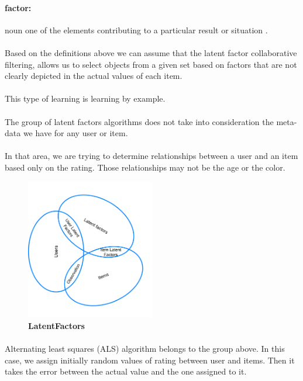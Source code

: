 \paragraph{factor:} noun one of the elements contributing to a particular result or situation \cite{Dictionary.com2017}.
\paragraph{} Based on the definitions above we can assume that the latent factor collaborative filtering, allows us to select objects from a given set based on factors that are not clearly depicted in the actual values of each item.
\paragraph{} This type of learning is learning by example.
\paragraph{} The group of latent factors algorithms does not take into consideration the meta-data we have for any user or item. 
\paragraph{} In that area, we are trying to determine relationships between a user and an item based only on the rating. Those relationships may not be the age or the color.

\begin{figure}[h]
	\centering
	\includegraphics[width=0.5\textwidth]{images/LatentFactors.png}
	\caption{\bfseries LatentFactors}
	\label{LatentFactors}
\end{figure}


\paragraph{} Alternating least squares (ALS) algorithm belongs to the group above. In this case, we assign initially random values of rating between user and items. Then it takes the error between the actual value and the one assigned to it. 

